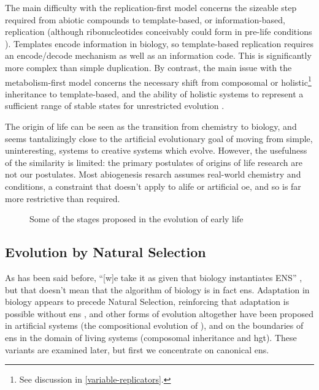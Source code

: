 The main difficulty with the replication-first model concerns the sizeable step required from abiotic compounds to template-based, or information-based, replication (although ribonucleotides conceivably could form in pre-life conditions \parencite{Powner2009}). Templates encode information in biology, so template-based replication requires an encode/decode mechanism as well as an information code. This is significantly more complex than simple duplication. By contrast, the main issue with the metabolism-first model concerns the necessary shift from composomal or holistic\footnote{See discussion in \cref{variable-replicators}.} inheritance to template-based, and the ability of holistic systems to represent a sufficient range of stable states for unrestricted evolution \parencite{Vasas2010}.

The origin of life can be seen as the transition from chemistry to biology, and seems tantalizingly close to the artificial evolutionary goal of moving from simple, uninteresting, systems to creative systems which evolve. However, the usefulness of the similarity is limited: the primary postulates of origins of life research are not our postulates. Most abiogenesis resarch assumes real-world chemistry and conditions, a constraint that doesn't apply to \gls{alife} or artificial \gls{oe}, and so is far more restrictive than required. 

\begin{figure}
	\begin{center}
	\end{center}
	\caption{Some of the stages proposed in the evolution of early life}
	\label{major-stages-early-life}
\end{figure}

\subsection{Evolution by Natural Selection}\label{evolution-by-natural-selection}

As has been said before, ``[w]e take it as given that biology instantiates ENS'' \parencite{Watson2012}, but that doesn't mean that the algorithm of biology is in fact \gls{ens}. Adaptation in biology appears to precede Natural Selection, reinforcing that adaptation is possible without \gls{ens} \parencite{Watson2010}, and other forms of evolution altogether have been proposed in artificial systems (\eg the compositional evolution of \textcite{Arthur2009}), and on the boundaries of \gls{ens} in the domain of living systems (\eg composomal inheritance and \gls{hgt}). These variants are examined later, but first we concentrate on canonical \gls{ens}.

